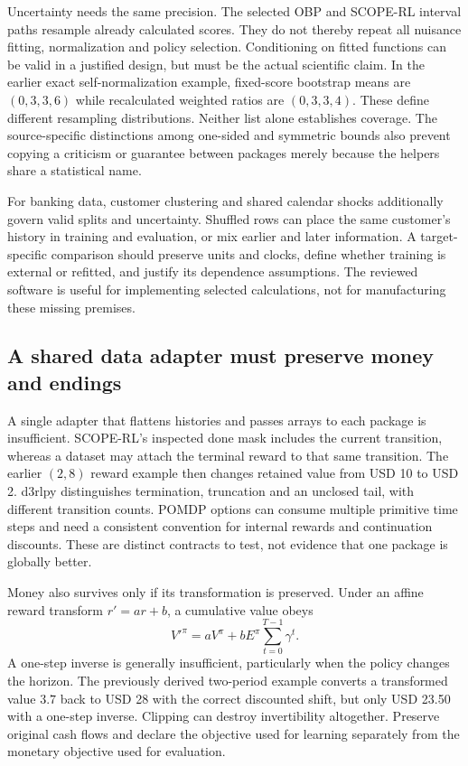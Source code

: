 Uncertainty needs the same precision. The selected OBP and SCOPE-RL interval
paths resample already calculated scores. They do not thereby repeat all nuisance
fitting, normalization and policy selection. Conditioning on fitted functions can
be valid in a justified design, but must be the actual scientific claim. In the
earlier exact self-normalization example, fixed-score bootstrap means are
$(0,3,3,6)$ while recalculated weighted ratios are $(0,3,3,4)$. These define
different resampling distributions. Neither list alone establishes coverage.
The source-specific distinctions among one-sided and symmetric bounds also
prevent copying a criticism or guarantee between packages merely because the
helpers share a statistical name.~\citep{exec23_obp_sources,
exec23_scope_rl_sources,exec23_scope_rl_reference}

For banking data, customer clustering and shared calendar shocks additionally
govern valid splits and uncertainty. Shuffled rows can place the same customer's
history in training and evaluation, or mix earlier and later information. A
target-specific comparison should preserve units and clocks, define whether
training is external or refitted, and justify its dependence assumptions. The
reviewed software is useful for implementing selected calculations, not for
manufacturing these missing premises.

\subsection{A shared data adapter must preserve money and endings}

A single adapter that flattens histories and passes arrays to each package is
insufficient. SCOPE-RL's inspected done mask includes the current transition,
whereas a dataset may attach the terminal reward to that same transition. The
earlier $(2,8)$ reward example then changes retained value from USD 10 to USD 2.
d3rlpy distinguishes termination, truncation and an unclosed tail, with different
transition counts. POMDP options can consume multiple primitive time steps and
need a consistent convention for internal rewards and continuation discounts.
These are distinct contracts to test, not evidence that one package is globally
better.~\citep{exec23_scope_rl_sources,exec23_scope_rl_reference,
exec15_d3rlpy_episode,exec23_pomdppy_sources}

Money also survives only if its transformation is preserved. Under an affine
reward transform $r'=ar+b$, a cumulative value obeys
\[
 V'^\pi=aV^\pi+bE^\pi\sum_{t=0}^{T-1}\gamma^t.
\]
A one-step inverse is generally insufficient, particularly when the policy
changes the horizon. The previously derived two-period example converts a
transformed value $3.7$ back to USD 28 with the correct discounted shift, but
only USD 23.50 with a one-step inverse. Clipping can destroy invertibility
altogether. Preserve original cash flows and declare the objective used for
learning separately from the monetary objective used for evaluation.
\citep{exec15_d3rlpy_value,exec15_d3rlpy_exact}

